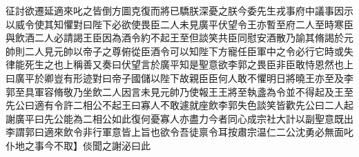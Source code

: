 征討欲遷延適來叱之皆倒方圖克復而將已驕朕深憂之朕今委先生戎事府中議事因示以威令使其知懼對曰陛下必欲使畏臣二人未見廣平伏望令王亦暫至府二人至時寒臣與飲酒二人必請謁王臣因為酒令約不起王至但談笑共臣同慰安酒散乃諭其脩謁於元帥則二人見元帥以帝子之尊俯從臣酒令可以知陛下方寵任臣軍中之令必行它時或失律能死生之也上稱善又奏曰伏望言於廣平知是聖意欲李郭之畏臣非臣敢恃恩然也上曰廣平於卿豈有形迹對曰帝子國儲以陛下故親臣臣何人敢不懼明日將曉王亦至及李郭至具軍容脩敬乃坐飲二人因言未見元帥乃使報王王將至執盞為令並不得起及王至先公曰適有令許二相公不起王曰寡人不敢遽就座飲李郭失色談笑皆歡先公曰二人起謝廣平曰先公能為二相公如此復何憂寡人亦盡力今者同心成宗社大計以副聖意既出李謂郭曰適來飲令非行軍意皆上旨也欲令吾徒禀令耳按肅宗温仁二公沈勇必無面叱仆地之事今不取】倓聞之謝泌曰此